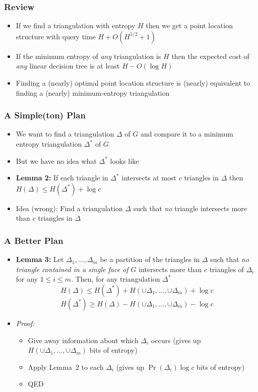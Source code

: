 \documentclass{beamer}
\begin{document}
\frame
{
   \frametitle{Review}

   \begin{itemize}
     \item<1-> If we find a triangulation with entropy $H$ then we get a
point location structure with query time $H+O(H^{1/2}+1)$
     \item<2-> If the minimum entropy of \emph{any} triangulation is $H$
then the expected cost of \emph{any} linear decision tree is at least
$H-O(\log H)$
     \item<3-> Finding a (nearly) optimal point location structure is
(nearly) equivalent to finding a (nearly) minimum-entropy triangulation
   \end{itemize} 
}

\frame
{
    \frametitle{A Simple(ton) Plan}

    \begin{itemize}
      \item<1-> We want to find a triangulation $\Delta$ of $G$ and compare it to
a minimum entropy triangulation $\Delta^*$ of $G$
      \item<2-> But we have no idea what $\Delta^*$ looks like
      \item<3-> \textbf{Lemma 2:} If each triangle in $\Delta^*$ intersects
at most $c$ triangles in $\Delta$ then $H(\Delta) \le H(\Delta^*)+\log c$
      \item<4-> Idea (wrong): Find a triangulation $\Delta$ such that \emph{no}
 triangle intersects more than $c$ triangles in $\Delta$
    \end{itemize}	
}


\frame
{
    \frametitle{A Better Plan}

    \begin{itemize}
      \item<1-> \textbf{Lemma 3:} Let $\Delta_1,\ldots,\Delta_m$ be a
partition of the triangles in $\Delta$ such that \emph{no triangle
contained in a single face of $G$}
intersects more than $c$ triangles of $\Delta_i$ for any $1\le i\le
m$. Then, for any triangulation $\Delta^*$
\[
      H(\Delta) \le H(\Delta^*) + H(\cup\Delta_1,\ldots,\cup\Delta_m) + \log c
\]
\[
      H(\Delta^*) \ge H(\Delta) - H(\cup\Delta_1,\ldots,\cup\Delta_m) - \log c
\]
     \item<2-> \textit{Proof:} 
      \begin{itemize}
       \item<3-> Give away information about which $\Delta_i$ occurs
(gives up $H(\cup\Delta_1,\ldots,\cup\Delta_m)$ bits of entropy)
       \item<4-> Apply Lemma~2 to each $\Delta_i$ (gives up
           $\Pr(\Delta_i)\log c$ bits of entropy)
       \item<5-> QED
      \end{itemize} 
    \end{itemize}
}
\end{document}
